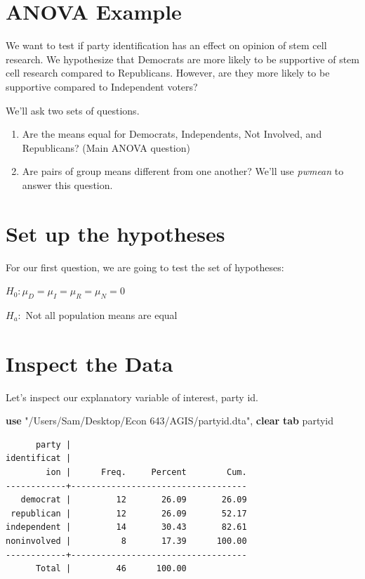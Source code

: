 \documentclass[
]{book}
\newenvironment{Shaded}{\begin{snugshade}}{\end{snugshade}}
\newcommand{\KeywordTok}[1]{\textcolor[rgb]{0.13,0.29,0.53}{\textbf{#1}}}
\newcommand{\NormalTok}[1]{#1}
\newcommand{\StringTok}[1]{\textcolor[rgb]{0.31,0.60,0.02}{#1}}
\providecommand{\tightlist}{%
  \setlength{\itemsep}{0pt}\setlength{\parskip}{0pt}}
\begin{document}
\section{ANOVA Example}\label{anova-example}

We want to test if party identification has an effect on opinion of stem cell research. We hypothesize that Democrats are more likely to be supportive of stem cell research compared to Republicans. However, are they more likely to be supportive compared to Independent voters?

We'll ask two sets of questions.

\begin{enumerate}
\def\labelenumi{\arabic{enumi}.}
\tightlist
\item
  Are the means equal for Democrats, Independents, Not Involved, and Republicans? (Main ANOVA question)
\item
  Are pairs of group means different from one another? We'll use \emph{pwmean} to answer this question.
\end{enumerate}

\section{Set up the hypotheses}\label{set-up-the-hypotheses}

For our first question, we are going to test the set of hypotheses:

\(H_0: \mu_D = \mu_I = \mu_R = \mu_N = 0\)

\(H_a:\) Not all population means are equal

\section{Inspect the Data}\label{inspect-the-data}

Let's inspect our explanatory variable of interest, party id.

\begin{Shaded}
\begin{Highlighting}[]
\KeywordTok{use} \StringTok{"/Users/Sam/Desktop/Econ 643/AGIS/partyid.dta"}\NormalTok{, }\KeywordTok{clear}
\KeywordTok{tab}\NormalTok{ partyid}
\end{Highlighting}
\end{Shaded}

\begin{verbatim}
      party |
identificat |
        ion |      Freq.     Percent        Cum.
------------+-----------------------------------
   democrat |         12       26.09       26.09
 republican |         12       26.09       52.17
independent |         14       30.43       82.61
noninvolved |          8       17.39      100.00
------------+-----------------------------------
      Total |         46      100.00
\end{verbatim}
\end{document}
